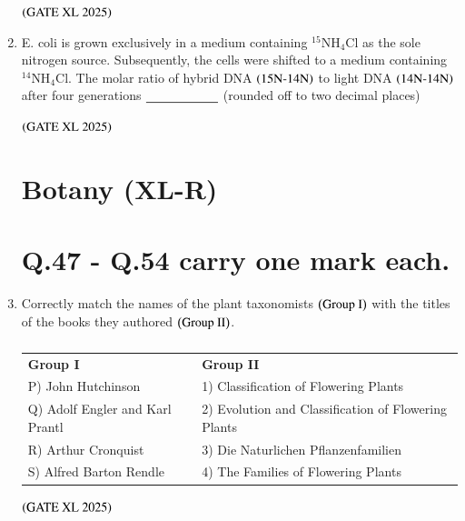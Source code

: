\documentclass[journal]{IEEEtran}
\begin{document}
\begin{enumerate}
    \hfill $\left(\text{GATE XL 2025}\right)$

    \item E. coli is grown exclusively in a medium containing $^{15}$NH$_4$Cl as the sole nitrogen source. Subsequently, the cells were shifted to a medium containing $^{14}$NH$_4$Cl. The molar ratio of hybrid DNA $\left(\text{15N-14N}\right)$ to light DNA $\left(\text{14N-14N}\right)$ after four generations $\underline{\rule{2cm}{0pt}}$ (rounded off to two decimal places)

    \hfill $\left(\text{GATE XL 2025}\right)$

\section*{Botany (XL-R)}
\section*{Q.47 - Q.54 carry one mark each.}

    \item Correctly match the names of the plant taxonomists $\left(\text{Group I}\right)$ with the titles of the books they authored $\left(\text{Group II}\right)$.

    \begin{table}[H]
        \centering
        \begin{tabular}{ll}
            \textbf{Group I} & \textbf{Group II} \\
            P) John Hutchinson & 1) Classification of Flowering Plants \\
            Q) Adolf Engler and Karl Prantl & 2) Evolution and Classification of Flowering Plants \\
            R) Arthur Cronquist & 3) Die Naturlichen Pflanzenfamilien \\
            S) Alfred Barton Rendle & 4) The Families of Flowering Plants \\
        \end{tabular}
        \caption*{}
        \label{tab:xl2025_q47}
    \end{table}

    \hfill $\left(\text{GATE XL 2025}\right)$
    \begin{enumerate}
    \end{enumerate}


\end{enumerate}
\end{document}
